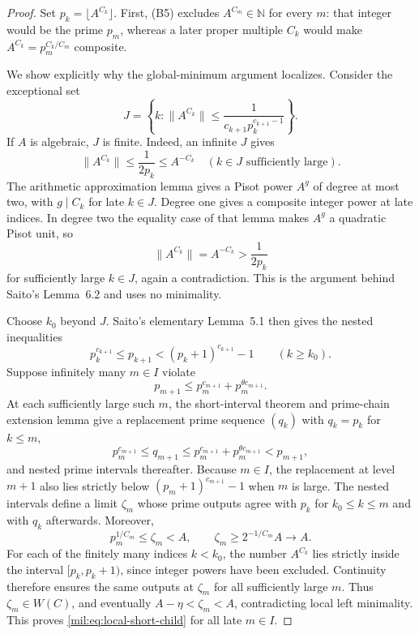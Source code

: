 \documentclass[11pt,a4paper]{article}
\theoremstyle{definition}
\theoremstyle{remark}
\numberwithin{equation}{section}
\begin{document}
\begin{proof}
Set $p_k=\lfloor A^{C_k}\rfloor$. First, (B5) excludes $A^{C_m}\in\mathbb N$ for every $m$: that integer would be the prime $p_m$, whereas a later proper multiple $C_k$ would make $A^{C_k}=p_m^{C_k/C_m}$ composite.

We show explicitly why the global-minimum argument localizes. Consider the exceptional set
\[
 J=\left\{k:\|A^{C_k}\|\leq
 \frac1{c_{k+1}p_k^{c_{k+1}-1}}\right\}.
\]
If $A$ is algebraic, $J$ is finite. Indeed, an infinite $J$ gives
\[
 \|A^{C_k}\|\leq\frac1{2p_k}\leq A^{-C_k}
 \quad(k\in J\text{ sufficiently large}).
\]
The arithmetic approximation lemma gives a Pisot power $A^g$ of degree at most two, with $g\mid C_k$ for late $k\in J$. Degree one gives a composite integer power at late indices. In degree two the equality case of that lemma makes $A^g$ a quadratic Pisot unit, so
\[
 \|A^{C_k}\|=A^{-C_k}>\frac1{2p_k}
\]
for sufficiently large $k\in J$, again a contradiction. This is the argument behind Saito's Lemma~6.2 and uses no minimality.

Choose $k_0$ beyond $J$. Saito's elementary Lemma~5.1 then gives the nested inequalities
\begin{equation}
 p_k^{c_{k+1}}\leq p_{k+1}<(p_k+1)^{c_{k+1}}-1
 \qquad(k\geq k_0).\label{mil:eq:local-nesting}
\end{equation}
Suppose infinitely many $m\in I$ violate
\begin{equation}
 p_{m+1}\leq p_m^{c_{m+1}}+p_m^{\theta c_{m+1}}.
 \label{mil:eq:local-short-child}
\end{equation}
At each sufficiently large such $m$, the short-interval theorem and prime-chain extension lemma give a replacement prime sequence $(q_k)$ with $q_k=p_k$ for $k\leq m$,
\[
 p_m^{c_{m+1}}\leq q_{m+1}
 \leq p_m^{c_{m+1}}+p_m^{\theta c_{m+1}}<p_{m+1},
\]
and nested prime intervals thereafter. Because $m\in I$, the replacement at level $m+1$ also lies strictly below $(p_m+1)^{c_{m+1}}-1$ when $m$ is large. The nested intervals define a limit $\zeta_m$ whose prime outputs agree with $p_k$ for $k_0\leq k\leq m$ and with $q_k$ afterwards. Moreover,
\[
 p_m^{1/C_m}\leq\zeta_m<A,
 \qquad
 \zeta_m\geq 2^{-1/C_m}A\longrightarrow A.
\]
For each of the finitely many indices $k<k_0$, the number $A^{C_k}$ lies strictly inside the interval $[p_k,p_k+1)$, since integer powers have been excluded. Continuity therefore ensures the same outputs at $\zeta_m$ for all sufficiently large $m$. Thus $\zeta_m\in W(C)$, and eventually $A-\eta<\zeta_m<A$, contradicting local left minimality. This proves \eqref{mil:eq:local-short-child} for all late $m\in I$.


\end{proof}
\end{document}
